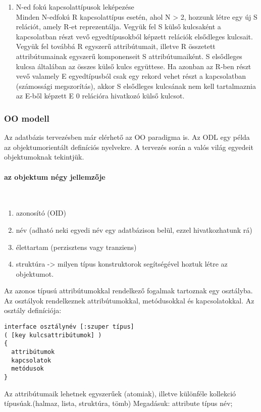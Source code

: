 \begin{enumerate}[nosep]
	\item N-ed fokú kapcsolattípusok leképezése\\
	{\footnotesize Minden N-edfokú R kapcsolattípus esetén, ahol N > 2, hozzunk létre egy új S relációt, amely R-et reprezentálja. Vegyük fel S külső kulcsaként a kapcsolatban részt vevő egyedtípusokból képzett relációk elsődleges kulcsait. Vegyük fel továbbá R egyszerű attribútumait, illetve R összetett attribútumainak egyszerű komponenseit S attribútumaiként. S elsődleges kulcsa általában az összes külső kulcs együttese. Ha azonban az R-ben részt vevő valamely E egyedtípusból csak egy rekord vehet részt a kapcsolatban (számossági megszorítás), akkor S elsődleges kulcsának nem kell tartalmaznia az E-ből képzett E 0 relációra hivatkozó külső kulcsot.}
\end{enumerate}

\subsubsection{OO modell}
Az adatbázis tervezésben már elérhető az OO paradigma is. Az ODL egy példa az
objektumorientált definíciós nyelvekre. A tervezés során a valós világ egyedeit
objektumoknak tekintjük.
\paragraph{az objektum négy jellemzője}~\\
\begin{enumerate}[nosep]
	\item azonosító (OID)
	\item név (adható neki egyedi név egy adatbázison belül, ezzel hivatkozhatunk rá)
	\item élettartam (perzisztens vagy tranziens)
	\item struktúra -> milyen típus konstruktorok segítségével hoztuk létre az objektumot.
\end{enumerate}
Az azonos típusú attribútumokkal rendelkező fogalmak tartoznak egy osztályba. Az osztályok rendelkeznek attribútumokkal, metódusokkal és kapcsolatokkal. Az osztály definíciója:
\begin{verbatim}
interface osztálynév [:szuper típus]
( [key kulcsattribútumok] )
{
  attribútumok
  kapcsolatok
  metódusok
}
\end{verbatim}
Az attribútumaik lehetnek egyszerűek (atomiak), illetve különféle kollekció típusúak.(halmaz, lista, struktúra, tömb) Megadásuk: attribute típus név;

